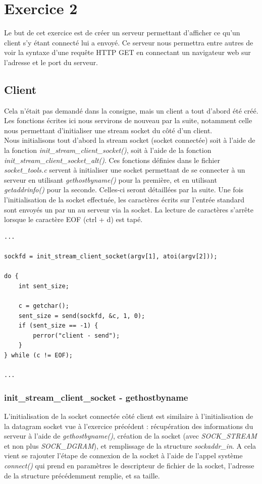 \section{Exercice 2}
Le but de cet exercice est de créer un serveur permettant d'afficher ce qu'un client s'y étant connecté lui a envoyé. Ce serveur nous permettra entre autres de voir la syntaxe d'une requête HTTP GET en connectant un navigateur web sur l'adresse et le port du serveur.

\subsection{Client}
Cela n'était pas demandé dans la consigne, mais un client a tout d'abord été créé. Les fonctions écrites ici nous servirons de nouveau par la suite, notamment celle nous permettant d'initialiser une stream socket du côté d'un client.\\

Nous initialisons tout d'abord la stream socket (socket connectée) soit à l'aide de la fonction \emph{init\_stream\_client\_socket()}, soit à l'aide de la fonction \emph{init\_stream\_client\_socket\_alt()}. Ces fonctions définies dans le fichier \emph{socket\_tools.c} servent à initialiser une socket permettant de se connecter à un serveur en utilisant \emph{gethostbyname()} pour la première, et en utilisant \emph{getaddrinfo()} pour la seconde. Celles-ci seront détaillées par la suite. Une fois l'initialisation de la socket effectuée, les caractères écrits sur l'entrée standard sont envoyés un par un au serveur via la socket. La lecture de caractères s'arrête lorsque le caractère EOF (ctrl + d) est tapé.

\begin{lstlisting}
...

sockfd = init_stream_client_socket(argv[1], atoi(argv[2]));

do {
    int sent_size;

    c = getchar();
    sent_size = send(sockfd, &c, 1, 0);
    if (sent_size == -1) {
        perror("client - send");
    }
} while (c != EOF);

...
\end{lstlisting}

\subsubsection{init\_stream\_client\_socket - gethostbyname}
L'initialisation de la socket connectée côté client est similaire à l'initialisation de la datagram socket vue à l'exercice précédent : récupération des informations du serveur à l'aide de \emph{gethostbyname()}, création de la socket (avec \emph{SOCK\_STREAM} et non plus \emph{SOCK\_DGRAM}), et remplissage de la structure \emph{sockaddr\_in}. A cela vient se rajouter l'étape de connexion de la socket à l'aide de l'appel système \emph{connect()} qui prend en paramètres le descripteur de fichier de la socket, l'adresse de la structure précédemment remplie, et sa taille.\\

